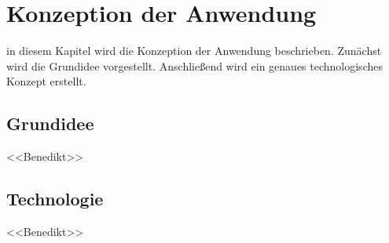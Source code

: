 \chapter{Konzeption der Anwendung}
\label{chapter:Konzeption der Anwendung}

in diesem Kapitel wird die Konzeption der Anwendung beschrieben. Zunächst wird die Grundidee vorgestellt. Anschließend wird ein genaues technologisches Konzept erstellt.

\section{Grundidee}
\label{section:Grundidee}

<<Benedikt>>
\Blindtext

\section{Technologie}
\label{section:Technologie}

<<Benedikt>>
\Blindtext
